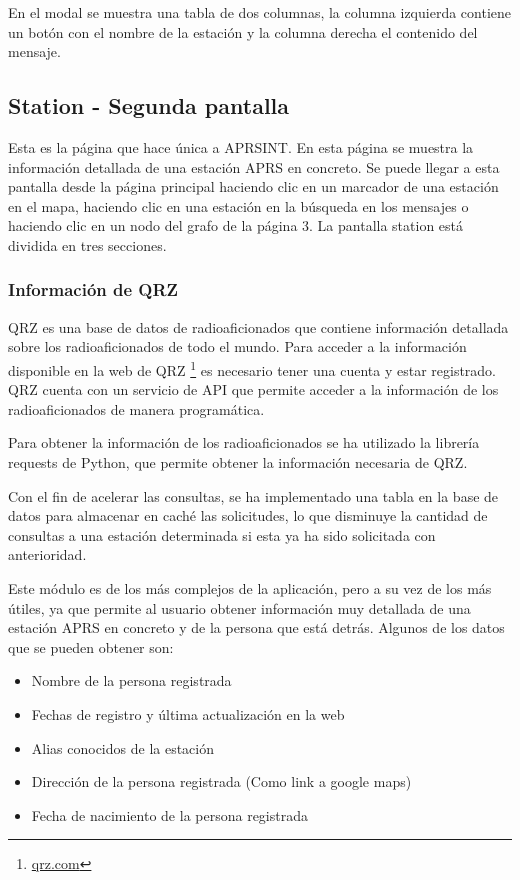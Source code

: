 \noindent En el modal se muestra una tabla de dos columnas, la columna izquierda contiene un botón con el nombre de la estación y la columna derecha el contenido del mensaje.

\subsection*{Station - Segunda pantalla}
Esta es la página que hace única a APRSINT. En esta página se muestra la información detallada de una estación APRS en concreto. Se puede llegar a esta pantalla desde la página principal haciendo clic en un marcador de una estación en el mapa, haciendo clic en una estación en la búsqueda en los mensajes o haciendo clic en un nodo del grafo de la página 3. La pantalla station está dividida en tres secciones.

\subsubsection*{Información de QRZ}
QRZ es una base de datos de radioaficionados que contiene información detallada sobre los radioaficionados de todo el mundo. Para acceder a la información disponible en la web de QRZ \footnote{\url{qrz.com}} es necesario tener una cuenta y estar registrado. QRZ cuenta con un servicio de API que permite acceder a la información de los radioaficionados de manera programática.

Para obtener la información de los radioaficionados se ha utilizado la librería requests de Python, que permite obtener la información necesaria de QRZ.

Con el fin de acelerar las consultas, se ha implementado una tabla en la base de datos para almacenar en caché las solicitudes, lo que disminuye la cantidad de consultas a una estación determinada si esta ya ha sido solicitada con anterioridad.

Este módulo es de los más complejos de la aplicación, pero a su vez de los más útiles, ya que permite al usuario obtener información muy detallada de una estación APRS en concreto y de la persona que está detrás. Algunos de los datos que se pueden obtener son:

\begin{itemize}
	\item Nombre de la persona registrada
	\item Fechas de registro y última actualización en la web
	\item Alias conocidos de la estación
	\item Dirección de la persona registrada (Como link a google maps)
	\item Fecha de nacimiento de la persona registrada
\end{itemize}

